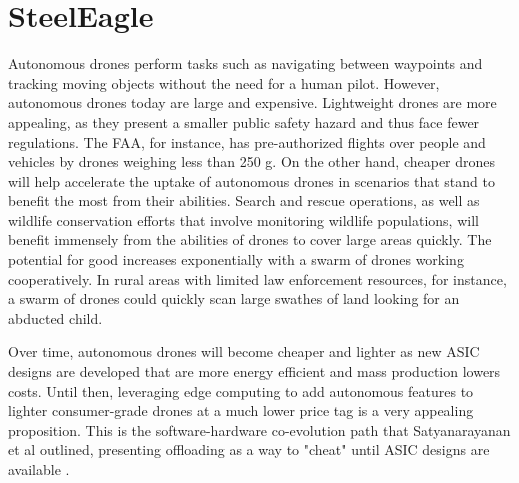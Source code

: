 \section{SteelEagle}

Autonomous drones perform tasks such as navigating between waypoints and
tracking moving objects without the need for a human pilot.  However,
autonomous drones today are large and expensive. Lightweight drones are more
appealing, as they present a smaller public safety hazard and thus face fewer
regulations. The FAA, for instance, has pre-authorized flights over people and
vehicles by drones weighing less than 250 g. On the other hand, cheaper drones
will help accelerate the uptake of autonomous drones in scenarios that stand to
benefit the most from their abilities. Search and rescue operations, as well as
wildlife conservation efforts that involve monitoring wildlife populations,
will benefit immensely from the abilities of drones to cover large areas
quickly. The potential for good increases exponentially with a swarm of drones
working cooperatively. In rural areas with limited law enforcement resources,
for instance, a swarm of drones could quickly scan large swathes of land
looking for an abducted child.

Over time, autonomous drones will
become cheaper and lighter as new ASIC designs are developed that are more
energy efficient and mass production lowers costs. Until then, leveraging edge
computing to add autonomous features to lighter consumer-grade drones at a much
lower price tag is a very appealing proposition. This is the software-hardware
co-evolution path that Satyanarayanan et al outlined, presenting offloading as
a way to "cheat" until ASIC designs are available \cite{satya21}.

